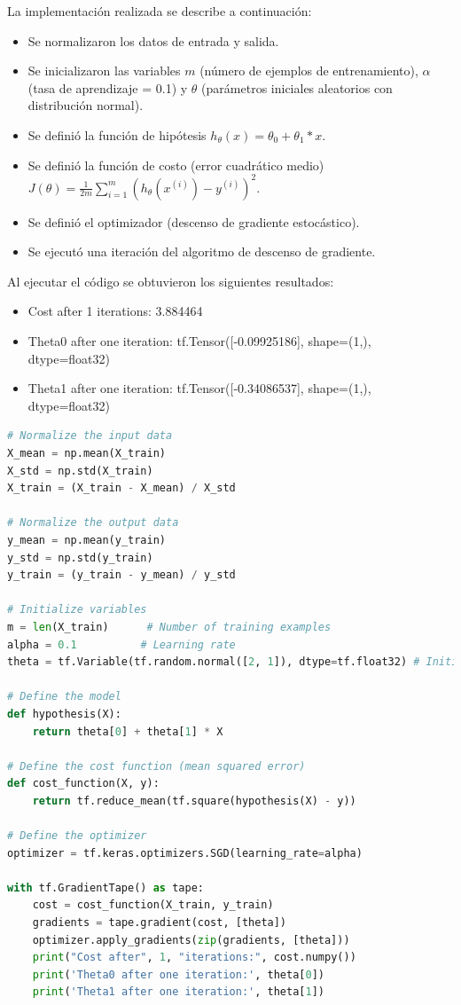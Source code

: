 \documentclass{article}
\begin{document}
    \noindent
    La implementación realizada se describe a continuación:
    \begin{itemize}
        \item Se normalizaron los datos de entrada y salida.
        \item Se inicializaron las variables $m$ (número de ejemplos de entrenamiento),
        $\alpha$ (tasa de aprendizaje = 0.1) y
        $\theta$ (parámetros iniciales aleatorios con distribución normal).
        \item Se definió la función de hipótesis $h_{\theta}(x) = \theta_0 + \theta_1 * x$.
        \item Se definió la función de costo (error cuadrático medio)
        $J(\theta) = \frac{1}{2m} \sum_{i=1}^{m} (h_{\theta}(x^{(i)}) - y^{(i)})^2$.
        \item Se definió el optimizador (descenso de gradiente estocástico).
        \item Se ejecutó una iteración del algoritmo de descenso de gradiente.
    \end{itemize}
    \noindent
    Al ejecutar el código se obtuvieron los siguientes resultados:
    \begin{itemize}
        \item Cost after 1 iterations: 3.884464
        \item Theta0 after one iteration: tf.Tensor([-0.09925186], shape=(1,), dtype=float32)
        \item Theta1 after one iteration: tf.Tensor([-0.34086537], shape=(1,), dtype=float32)
    \end{itemize}
    \begin{lstlisting}[language=Python, caption={Regresión lineal utilizando descenso de gradiente},label={lst:GradientDescent}]
# Normalize the input data
X_mean = np.mean(X_train)
X_std = np.std(X_train)
X_train = (X_train - X_mean) / X_std

# Normalize the output data
y_mean = np.mean(y_train)
y_std = np.std(y_train)
y_train = (y_train - y_mean) / y_std

# Initialize variables
m = len(X_train)      # Number of training examples
alpha = 0.1          # Learning rate
theta = tf.Variable(tf.random.normal([2, 1]), dtype=tf.float32) # Initial random parameters

# Define the model
def hypothesis(X):
    return theta[0] + theta[1] * X

# Define the cost function (mean squared error)
def cost_function(X, y):
    return tf.reduce_mean(tf.square(hypothesis(X) - y))

# Define the optimizer
optimizer = tf.keras.optimizers.SGD(learning_rate=alpha)

with tf.GradientTape() as tape:
    cost = cost_function(X_train, y_train)
    gradients = tape.gradient(cost, [theta])
    optimizer.apply_gradients(zip(gradients, [theta]))
    print("Cost after", 1, "iterations:", cost.numpy())
    print('Theta0 after one iteration:', theta[0])
    print('Theta1 after one iteration:', theta[1])
    \end{lstlisting}
    \clearpage
\end{document}
